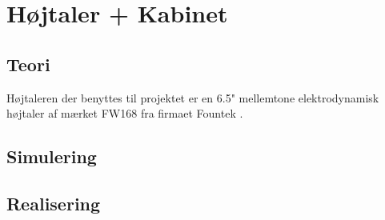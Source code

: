 \chapter{Højtaler + Kabinet}

\section{Teori}

Højtaleren der benyttes til projektet er en 6.5" mellemtone elektrodynamisk højtaler af mærket FW168\cite{FW168} fra firmaet Fountek \cite{Fountek}.

\section{Simulering}
\section{Realisering}